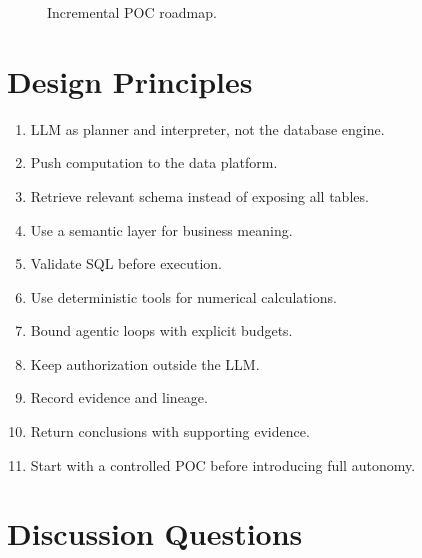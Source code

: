 \documentclass[11pt,a4paper]{article}
\begin{document}
\begin{figure}[H]
\centering
{}
\caption{Incremental POC roadmap.}
\label{fig:roadmap}
\end{figure}

\section{Design Principles}

\begin{enumerate}[leftmargin=*]
    \item LLM as planner and interpreter, not the database engine.
    \item Push computation to the data platform.
    \item Retrieve relevant schema instead of exposing all tables.
    \item Use a semantic layer for business meaning.
    \item Validate SQL before execution.
    \item Use deterministic tools for numerical calculations.
    \item Bound agentic loops with explicit budgets.
    \item Keep authorization outside the LLM.
    \item Record evidence and lineage.
    \item Return conclusions with supporting evidence.
    \item Start with a controlled POC before introducing full autonomy.
\end{enumerate}

\section{Discussion Questions}
\end{document}
